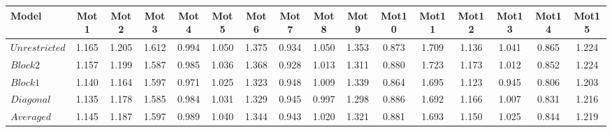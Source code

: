 \begin{tabular} 
 {l    *{15}{c} } 
Model & Mot1 & Mot2 & Mot3 & Mot4 & Mot5 & Mot6 & Mot7 & Mot8 & Mot9 & Mot10 & Mot11 & Mot12 & Mot13 & Mot14 & Mot15   \\  \hline \hline
$Unrestricted$ &  1.165 &  1.205&  1.612&  0.994&  1.050&  1.375&  0.934&  1.050&  1.353&  0.873&  1.709&  1.136&  1.041&  0.865&  1.224 \\ 
$Block2$ &  1.157 &  1.199&  1.587&  0.985&  1.036&  1.368&  0.928&  1.013&  1.311&  0.880&  1.723&  1.173&  1.012&  0.852&  1.224  \\ 
$Block1$ &  1.140 &  1.164&  1.597&  0.971&  1.025&  1.323&  0.948&  1.009&  1.339&  0.864&  1.695&  1.123&  0.945&  0.806&  1.203  \\ 
$Diagonal$ &  1.135 &  1.178&  1.585&  0.984&  1.031&  1.329&  0.945&  0.997&  1.298&  0.886&  1.692&  1.166&  1.007&  0.831&  1.216 \\ \hline  
$Averaged$ &  1.145 &  1.187&  1.597&  0.989&  1.040&  1.344&  0.943&  1.020&  1.321&  0.881&  1.693&  1.150&  1.025&  0.844&  1.219  \\ 
\hline \hline
 \end{tabular} 
